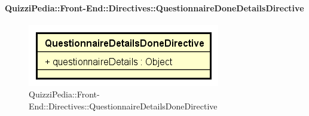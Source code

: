 \paragraph{QuizziPedia::Front-End::Directives::QuestionnaireDoneDetailsDirective}

\label{QuizziPedia::Front-End::Directives::QuestionnaireDoneDetailsDirective}

\begin{figure}[ht]
	\centering
	\includegraphics[scale=0.80,keepaspectratio]{UML/Classi/Front-End/QuizziPedia_Front-end_Directives_QuestionnaireDetailsDoneDirective.png}
	\caption{QuizziPedia::Front-End::Directives::QuestionnaireDetailsDoneDirective}
\end{figure} \FloatBarrier

